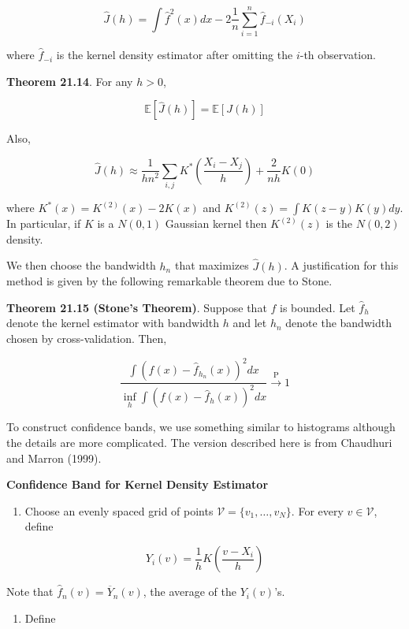 \[ \hat{J}(h) = \int \hat{f}^2(x) dx - 2 \frac{1}{n} \sum_{i=1}^n \hat{f}_{-i}(X_i) \]

where \(\hat{f}_{-i}\) is the kernel density estimator after omitting
the \(i\)-th observation.

\textbf{Theorem 21.14}. For any \(h > 0\),

\[ \mathbb{E} \left[ \hat{J}(h) \right] = \mathbb{E} \left[ J(h) \right] \]

Also,

\[ \hat{J}(h) \approx \frac{1}{hn^2}\sum_{i, j} K^* \left( \frac{X_i - X_j}{h} \right) + \frac{2}{nh} K(0) \]

where \(K^*(x) = K^{(2)}(x) - 2 K(x)\) and
\(K^{(2)}(z) = \int K(z - y) K(y) dy\). In particular, if \(K\) is a
\(N(0, 1)\) Gaussian kernel then \(K^{(2)}(z)\) is the \(N(0, 2)\)
density.

We then choose the bandwidth \(h_n\) that maximizes \(\hat{J}(h)\). A
justification for this method is given by the following remarkable
theorem due to Stone.

\textbf{Theorem 21.15 (Stone's Theorem)}. Suppose that \(f\) is bounded.
Let \(\hat{f}_h\) denote the kernel estimator with bandwidth \(h\) and
let \(h_n\) denote the bandwidth chosen by cross-validation. Then,

\[ \frac{\int \left( f(x) - \hat{f}_{h_n}(x)\right)^2 dx}{\inf_h \int \left( f(x) - \hat{f}_h(x) \right)^2 dx} \xrightarrow{\text{P}} 1\]

To construct confidence bands, we use something similar to histograms
although the details are more complicated. The version described here is
from Chaudhuri and Marron (1999).

\textbf{Confidence Band for Kernel Density Estimator}

\begin{enumerate}[tightlist,label={\arabic*.}]
\item
  Choose an evenly spaced grid of points
  \(\mathcal{V} = \{ v_1, \dots, v_N \}\). For every
  \(v \in \mathcal{V}\), define
\end{enumerate}

\[ Y_i(v) = \frac{1}{h} K \left( \frac{v - X_i}{h} \right) \]

Note that \(\hat{f}_n(v) = \overline{Y}_n(v)\), the average of the
\(Y_i(v)\)'s.

\begin{enumerate}[tightlist,label={\arabic*.}]
\item
  Define
\end{enumerate}

